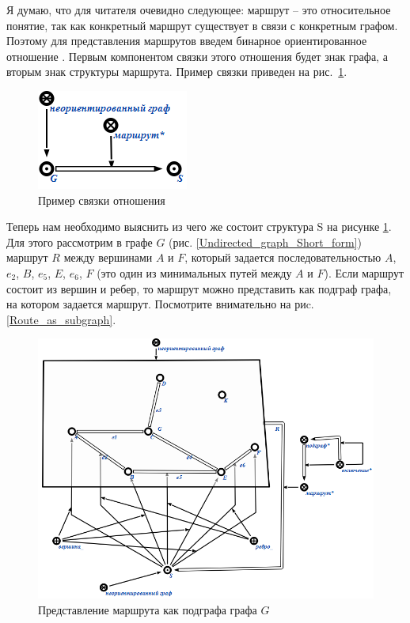 Я думаю, что для читателя очевидно следующее: маршрут – это
относительное понятие, так как конкретный маршрут существует в связи с
конкретным графом. Поэтому для представления маршрутов введем бинарное
ориентированное отношение . Первым компонентом связки
этого отношения будет знак графа, а вторым знак структуры
маршрута. Пример связки приведен на
рис.~\ref{fig:Example_of_relations_Route_tuple}.

\begin{figure}[h]
  \centering
  \includegraphics{images/2/Example_of_relations_Route_tuple}
  \caption{Пример связки отношения }
  \label{fig:Example_of_relations_Route_tuple}
\end{figure}

Теперь нам необходимо выяснить из чего же состоит структура S на
рисунке \ref{fig:Example_of_relations_Route_tuple}. Для этого
рассмотрим в графе $G$ (рис. \ref{Undirected_graph_Short_form})
маршрут $R$ между вершинами $A$ и $F$, который задается последовательностью
$A$, $e_2$, $B$, $e_5$, $E$, $e_6$, $F$ (это один из минимальных путей между $A$ и
$F$). Если маршрут состоит из вершин и ребер, то маршрут можно
представить как подграф графа, на котором задается маршрут. Посмотрите
внимательно на риc. \ref{Route_as_subgraph}.

\begin{figure}
  \centering
  \includegraphics[scale=0.8]{images/2/Route_as_subgraph}
  \caption{Представление маршрута как подграфа графа $G$}
  \label{fig:Route_as_subgraph}
\end{figure}


